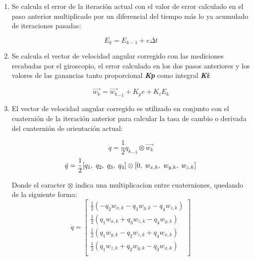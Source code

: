 \begin{enumerate}
        \item Se calcula el error de la iteración actual con el valor de error calculado en el paso anterior multiplicado por un diferencial del tiempo más lo ya acumulado de iteraciones pasadas:
 
        \begin{equation}
                E_k = E_{k-1} + e\Delta t
        \end{equation}

        \item Se calcula el vector de velocidad angular corregido con las mediciones recabadas por el giroscopio, el error calculado en los dos pasos anteriores y los valores de las ganancias tanto proporcional \textbf{\textit{Kp}} como integral \textbf{\textit{Ki}}:
        
        \begin{equation}
            \vec{w_k} = \vec{w_k}_{-1} + K_pe +K_iE_k 
        \end{equation}
            
        \item El vector de velocidad angular corregido es utilizado en conjunto con el cuaternión de la iteración anterior para calcular la tasa de cambio o derivada del cuaternión de orientación actual:
        
        \begin{equation}
            \dot{q} = \frac{1}{2}{q_k}_{-1} \otimes \vec{w_k} 
        \end{equation}
        \begin{equation}
            \dot{q} = \frac{1}{2}[q_1, \hspace{1mm} q_2, \hspace{1mm} q_3, \hspace{1mm} q_4] \otimes [0, \hspace{1mm} w_{x,k}, \hspace{1mm} w_{y,k}, \hspace{1mm} w_{z,k}] 
        \end{equation}

        Donde el caracter $ \otimes $  indica una multiplicacion entre cuaterniones, quedando de la siguiente forma:
        \begin{equation}
            \dot{q} = 
                \begin{bmatrix}
                    \frac{1}{2}(-q_2w_{x,k} - q_3w_{y,k} - q_4w_{z,k}) \\
                    \frac{1}{2}( q_1w_{x,k} + q_3w_{z,k} - q_4w_{y,k}) \\
                    \frac{1}{2}( q_1w_{y,k} - q_2w_{z,k} + q_4w_{x,k}) \\
                    \frac{1}{2}( q_1w_{z,k} + q_2w_{y,k} - q_3w_{x,k}) \\
                \end{bmatrix} 
        \end{equation}    


\end{enumerate}
